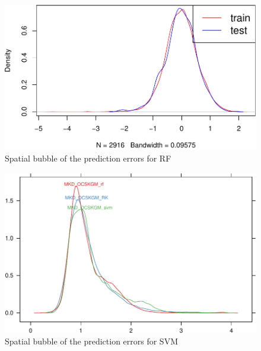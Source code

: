\documentclass[10pt,b5paper,]{book}
\newenvironment{Shaded}{\begin{snugshade}}{\end{snugshade}}
\newcommand{\CommentTok}[1]{\textcolor[rgb]{0.56,0.35,0.01}{\textit{#1}}}
\newcommand{\DataTypeTok}[1]{\textcolor[rgb]{0.13,0.29,0.53}{#1}}
\newcommand{\DecValTok}[1]{\textcolor[rgb]{0.00,0.00,0.81}{#1}}
\newcommand{\KeywordTok}[1]{\textcolor[rgb]{0.13,0.29,0.53}{\textbf{#1}}}
\newcommand{\NormalTok}[1]{#1}
\newcommand{\OperatorTok}[1]{\textcolor[rgb]{0.81,0.36,0.00}{\textbf{#1}}}
\newcommand{\StringTok}[1]{\textcolor[rgb]{0.31,0.60,0.02}{#1}}
\theoremstyle{definition}
\theoremstyle{definition}
\theoremstyle{definition}
\theoremstyle{remark}
\begin{document}
\begin{Shaded}
\end{Shaded}

\begin{figure}
\includegraphics[width=0.6\linewidth]{SOCMapping_files/figure-latex/unnamed-chunk-92-1} \caption{Spatial bubble of the prediction errors for RF}\label{fig:unnamed-chunk-92}
\end{figure}

\begin{Shaded}
\end{Shaded}

\begin{figure}
\includegraphics[width=0.6\linewidth]{SOCMapping_files/figure-latex/unnamed-chunk-93-1} \caption{Spatial bubble of the prediction errors for SVM}\label{fig:unnamed-chunk-93}
\end{figure}
\end{document}
